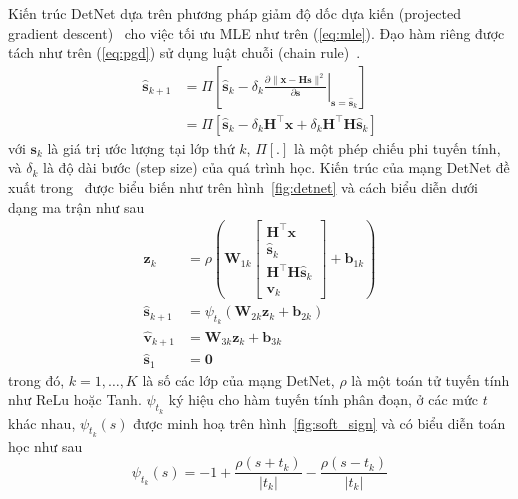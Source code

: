 Kiến trúc DetNet dựa trên phương pháp giảm độ dốc dựa kiến (projected gradient descent)~\cite{Chen2015} cho việc tối ưu MLE như trên (\ref{eq:mle}). Đạo hàm riêng được tách như trên (\ref{eq:pgd}) sử dụng luật chuỗi (chain rule)~\cite{Minka2000}.
\begin{equation}
\label{eq:pgd}
    \begin{aligned}
    \hat{\mathbf{s}}_{k+1} & =\Pi\left[\hat{\mathbf{s}}_k-\left.\delta_k \frac{\partial\|\mathbf{x}-\mathbf{H} \mathbf{s}\|^2}{\partial \mathbf{s}}\right|_{\mathbf{s}=\hat{\mathbf{s}}_k}\right] \\
    & =\Pi\left[\hat{\mathbf{s}}_k-\delta_k \mathbf{H}^\top \mathbf{x}+\delta_k \mathbf{H}^\top \mathbf{H} \hat{\mathbf{s}}_k\right]
    \end{aligned}
\end{equation}
với $\mathbf{s}_k$ là giá trị ước lượng tại lớp thứ $k$, $\Pi [.]$ là một phép chiếu phi tuyến tính, và $\delta_k$ là độ dài bước (step size) của quá trình học. Kiến trúc của mạng DetNet đề xuất trong~\cite{Samuel2017} được biểu biến như trên hình~\ref{fig:detnet} và cách biểu diễn dưới dạng ma trận như sau
\allowdisplaybreaks
\begin{subequations}
\begin{alignat}{4}
    \mathbf{z}_k & =\rho\left(\mathbf{W}_{1 k}\left[\begin{array}{c}
    \mathbf{H}^\top \mathbf{x} \\
    \hat{\mathbf{s}}_k \\
    \mathbf{H}^\top \mathbf{H} \hat{\mathbf{s}}_k \\
    \mathbf{v}_k
    \end{array}\right]+\mathbf{b}_{1 k}\right) \\
    \hat{\mathbf{s}}_{k+1} & =\psi_{t_k}\left(\mathbf{W}_{2 k} \mathbf{z}_k+ \mathbf{b}_{2 k}\right) \\
    \hat{\mathbf{v}}_{k+1} & =\mathbf{W}_{3 k} \mathbf{z}_k+ 
    \mathbf{b}_{3 k} \\
    \hat{\mathbf{s}}_1 & =\mathbf{0}
\end{alignat}
\end{subequations}
trong đó, $k = 1, \ldots, K$ là số các lớp của mạng DetNet, $\rho$ là một toán tử tuyến tính như ReLu hoặc Tanh. $\psi_{t_k}$ ký hiệu cho hàm tuyến tính phân đoạn, ở các mức $t$ khác nhau, $\psi_{t_k}(s)$ được minh hoạ trên hình~\ref{fig:soft_sign} và có biểu diễn toán học như sau
\begin{equation}
    \psi_{t_k}(s)=-1+\frac{\rho\left(s + t_k \right)}{\left|t_k\right|}-\frac{\rho\left(s- t_k \right)}{\left|t_k\right|}
\end{equation}

